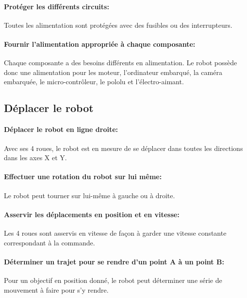 \paragraph{Protéger les différents circuits:}

Toutes les alimentation sont protégées avec des fusibles ou des interrupteurs.

\paragraph{Fournir l'alimentation appropriée à chaque composante:}

Chaque composante a des besoins différents en alimentation. Le robot possède donc une alimentation pour les moteur, l'ordinateur embarqué, la caméra embarquée, le micro-contrôleur, le pololu et l'électro-aimant.

\subsection{Déplacer le robot}

\paragraph{Déplacer le robot en ligne droite:}

Avec ses 4 roues, le robot est en mesure de se déplacer dans toutes les directions dans les axes X et Y.

\paragraph{Effectuer une rotation du robot sur lui même:}

Le robot peut tourner sur lui-même à gauche ou à droite.

\paragraph{Asservir les déplacements en position et en vitesse:}

Les 4 roues sont asservis en vitesse de façon à garder une vitesse constante correspondant à la commande.

\paragraph{Déterminer un trajet pour se rendre d'un point A à un point B:}

Pour un objectif en position donné, le robot peut déterminer une série de mouvement à faire pour s'y rendre.

